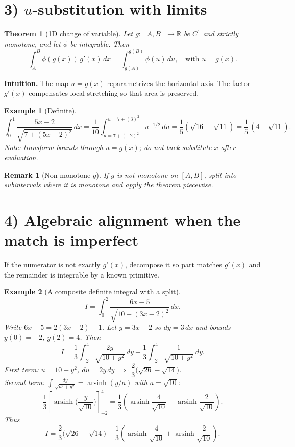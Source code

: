 \documentclass[12pt]{article}
\newtheorem{theorem}{Theorem}
\newtheorem{remark}{Remark}
\newtheorem{example}{Example}
\begin{document}
\section*{3) \texorpdfstring{$u$}{u}-substitution with limits}
\begin{theorem}[1D change of variable]
Let \(g:[A,B]\to\mathbb R\) be \(C^{1}\) and strictly monotone, and let \(\phi\) be integrable. Then
\[
\int_{A}^{B}\phi(g(x))\,g'(x)\,dx=\int_{g(A)}^{g(B)} \phi(u)\,du,
\quad \text{with }u=g(x).
\]
\end{theorem}

\noindent\textbf{Intuition.} The map \(u=g(x)\) reparametrizes the horizontal axis. The factor \(g'(x)\) compensates local stretching so that area is preserved.

\begin{example}[Definite]
\[
\int_{0}^{1}\frac{5x-2}{\sqrt{7+(5x-2)^2}}\,dx
=\frac{1}{10}\int_{u=7+(-2)^2}^{u=7+(3)^2}u^{-1/2}\,du
=\frac{1}{5}\!\left(\sqrt{16}-\sqrt{11}\right)=\frac{1}{5}\,(4-\sqrt{11}).
\]
\emph{Note:} transform bounds through \(u=g(x)\); do not back-substitute \(x\) after evaluation.
\end{example}

\begin{remark}[Non-monotone \(g\)]
If \(g\) is not monotone on \([A,B]\), split into subintervals where it is monotone and apply the theorem piecewise.
\end{remark}

\section*{4) Algebraic alignment when the match is imperfect}
If the numerator is not exactly \(g'(x)\), decompose it so part matches \(g'(x)\) and the remainder is integrable by a known primitive.

\begin{example}[A composite definite integral with a split]\label{ex:composite}
\[
I=\int_{0}^{2}\frac{6x-5}{\sqrt{10+(3x-2)^2}}\,dx.
\]
Write \(6x-5=2(3x-2)-1\). Let \(y=3x-2\) so \(dy=3\,dx\) and bounds \(y(0)=-2\), \(y(2)=4\). Then
\[
I=\frac{1}{3}\int_{-2}^{4}\frac{2y}{\sqrt{10+y^2}}\,dy
-\frac{1}{3}\int_{-2}^{4}\frac{1}{\sqrt{10+y^2}}\,dy.
\]
First term: \(u=10+y^2\), \(du=2y\,dy\) \(\Rightarrow\) \(\dfrac{2}{3}\big(\sqrt{26}-\sqrt{14}\big)\).\\
Second term: \(\displaystyle \int \frac{dy}{\sqrt{a^2+y^2}}=\operatorname{arsinh}(y/a)\) with \(a=\sqrt{10}\):
\[
\frac{1}{3}\left[\operatorname{arsinh}\!\Big(\frac{y}{\sqrt{10}}\Big)\right]_{-2}^{4}
=\frac{1}{3}\!\left(\operatorname{arsinh}\frac{4}{\sqrt{10}}+\operatorname{arsinh}\frac{2}{\sqrt{10}}\right).
\]
Thus
\[
\boxed{\,I=\frac{2}{3}\big(\sqrt{26}-\sqrt{14}\big)-\frac{1}{3}\!\left(\operatorname{arsinh}\frac{4}{\sqrt{10}}+\operatorname{arsinh}\frac{2}{\sqrt{10}}\right).\,}
\]
\end{example}
\end{document}
